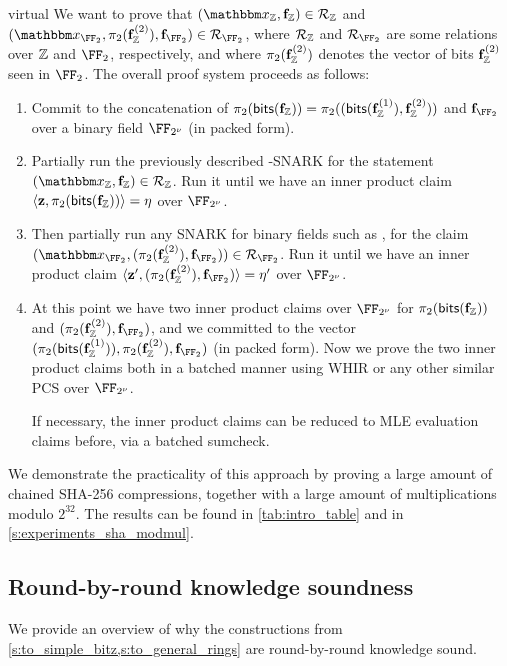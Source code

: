 \begin{lncsappendix}{virtual}
We want to prove that $(\inp_\ZZ, \bff_\ZZ)\in \Relation_\ZZ$ and $(\inp_{\FF_2}, \pi_2(\bff_{\ZZ}^{(2)}), \bff_{\FF_2})\in \Relation_{\FF_2}$, where $\mathcal{R}_{\mathbb{Z}}$ and $\Relation_{\FF_2}$ are some relations over $\mathbb{Z}$ and $\FF_2$, respectively, and where $\pi_2(\mathbf{f}_{\mathbb{Z}}^{(2)})$ denotes the vector of bits $\mathbf{f}_{\mathbb{Z}}^{(2)}$ seen in $\FF_2$. The overall proof system proceeds as follows:  
\begin{enumerate}[leftmargin=*,nosep]
        \item Commit to the concatenation of $\pi_2(\mathsf{bits}(\mathbf{f}_{\mathbb{Z}}))=\pi_2((\mathsf{bits}(\mathbf{f}_{\mathbb{Z}}^{(1)}), \mathbf{f}_{\mathbb{Z}}^{(2)}))$ and $\bff_{\FF_2}$ over a binary field $\comfield$ (in packed form).
        \item  Partially run the previously described \ftwoz-SNARK for the statement $(\inp_\ZZ, \bff_\ZZ)\in \Relation_\ZZ$. Run it until we have an inner product claim $\langle\mathbf{z}, \pi_2(\mathsf{bits}(\mathbf{f}_{\mathbb{Z}}))\rangle= \eta$  over $\comfield$. 
        \item Then partially run any SNARK for binary fields such as \cite{binius64}, for the claim $(\inp_{\FF_2}, (\pi_2(\bff_{\ZZ}^{(2)}), \bff_{\FF_2}))\in \Relation_{\FF_2}$. Run it until we have an inner product claim $\langle\zz', (\pi_2(\bff_{\ZZ}^{(2)}), \bff_{\FF_2})\rangle= \eta'$  over $\comfield$.
        \item At this point we have two inner product claims over $\comfield$ for $\pi_2(\mathsf{bits}(\mathbf{f}_{\mathbb{Z}}))$ and $(\pi_2(\bff_{\ZZ}^{(2)}), \bff_{\FF_2})$, and we committed to the vector  $(\pi_2(\bitstext(\bff_\ZZ^{(1)})),\pi_2(\bff_{\ZZ}^{(2)}), \bff_{\FF_2})$ (in packed form). Now we prove the two inner product claims  both in a batched manner using WHIR \cite{whir} or any other similar PCS over $\comfield$. 
        
        If necessary, the inner product claims can be reduced to MLE evaluation claims before, via a batched sumcheck.
    \end{enumerate}
\bigskip
\noindent We demonstrate the practicality of this approach by proving a large amount of chained SHA-256 compressions, together with a large amount of multiplications modulo $2^{32}$. The results can be found in \cref{tab:intro_table} and in \cref{s:experiments_sha_modmul}. 




\end{lncsappendix}
\iflncs\else\subsection{Round-by-round knowledge soundness}\label{s:to_soundness}\fi %
\iflncs\else
 We provide an overview of why the constructions from \cref{s:to_simple_bitz,s:to_general_rings} are round-by-round knowledge sound.  
\fi



